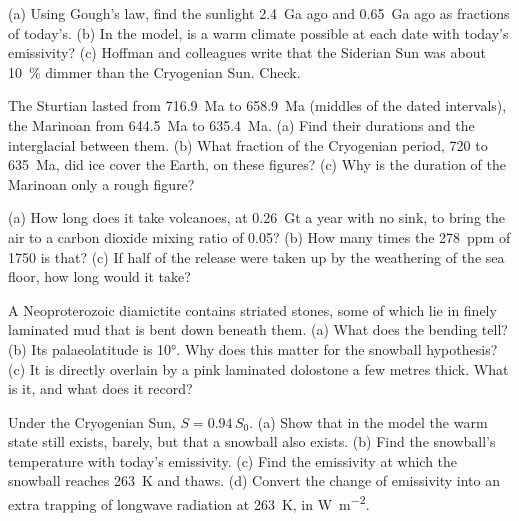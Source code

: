 \begin{exercise}[$\star\star$]\label{exo:b2:precambrian-earth:6}
(a) Using Gough's law, find the sunlight \qty{2.4}{Ga} ago and \qty{0.65}{Ga} ago as fractions
of today's. (b) In the model, is a warm climate possible at each date with today's emissivity?
(c) Hoffman and colleagues write that the Siderian Sun was about \qty{10}{\percent} dimmer than
the Cryogenian Sun. Check.
\end{exercise}

\begin{exercise}[$\star\star$]\label{exo:b2:precambrian-earth:7}
The Sturtian lasted from \qty{716.9}{Ma} to \qty{658.9}{Ma} (middles of the dated intervals),
the Marinoan from \qty{644.5}{Ma} to \qty{635.4}{Ma}. (a) Find their durations and the
interglacial between them. (b) What fraction of the Cryogenian period, 720 to \qty{635}{Ma},
did ice cover the Earth, on these figures? (c) Why is the duration of the Marinoan only a
rough figure?
\end{exercise}

\begin{exercise}[$\star\star$]\label{exo:b2:precambrian-earth:8}
(a) How long does it take volcanoes, at \qty{0.26}{Gt} a year with no sink, to bring the air to
a carbon dioxide mixing ratio of 0.05? (b) How many times the \qty{278}{ppm} of 1750 is that? (c) If half of the release were taken up by the weathering of the sea
floor, how long would it take?
\end{exercise}

\begin{exercise}[$\star\star$]\label{exo:b2:precambrian-earth:9}
A Neoproterozoic diamictite contains striated stones, some of which lie in finely laminated mud
that is bent down beneath them. (a) What does the bending tell? (b) Its palaeolatitude is
\ang{10}. Why does this matter for the snowball hypothesis? (c) It is directly overlain by a
pink laminated dolostone a few metres thick. What is it, and what does it record?
\end{exercise}

\begin{exercise}[$\star\star\star$]\label{exo:b2:precambrian-earth:10}
Under the Cryogenian Sun, $S = 0.94\,S_0$. (a) Show that in the model the warm state still
exists, barely, but that a snowball also exists. (b) Find the snowball's temperature with
today's emissivity. (c) Find the emissivity at which the snowball reaches \qty{263}{K} and
thaws. (d) Convert the change of emissivity into an extra trapping of longwave radiation at
\qty{263}{K}, in \unit{W.m^{-2}}.
\end{exercise}

